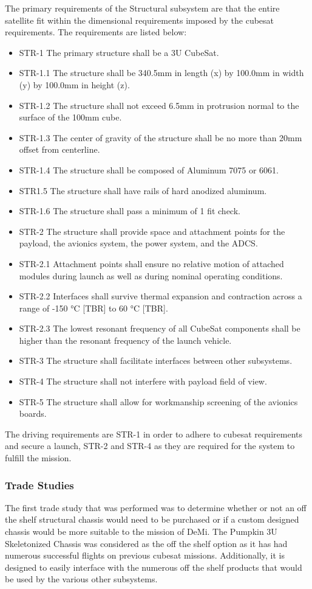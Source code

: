 \documentclass[12pt]{article}
\begin{document}
The primary requirements of the Structural subsystem are that the entire satellite fit within the dimensional requirements imposed by the cubesat requirements. The requirements are listed below:

\begin{itemize}
\item STR-1 The primary structure shall be a 3U CubeSat.
\item STR-1.1 The structure shall be 340.5mm in length (x) by 100.0mm in width (y) by 100.0mm in height (z).
\item STR-1.2 The structure shall not exceed 6.5mm in protrusion normal to the surface of the 100mm cube.             
\item STR-1.3 The center of gravity of the structure shall be no more than 20mm offset from centerline.
\item STR-1.4 The structure shall be composed of Aluminum 7075 or 6061.
\item STR1.5 The structure shall have rails of hard anodized aluminum.
\item STR-1.6 The structure shall pass a minimum of 1 fit check.
\item STR-2 The structure shall provide space and attachment points for the payload, the avionics system, the power system, and the ADCS.
\item STR-2.1 Attachment points shall ensure no relative motion of attached modules during launch as well as during nominal operating conditions.
\item STR-2.2 Interfaces shall survive thermal expansion and contraction across a range of -150 °C [TBR] to 60 °C [TBR].
\item STR-2.3 The lowest resonant frequency of all CubeSat components shall be higher than the resonant frequency of the launch vehicle.
\item STR-3 The structure shall facilitate interfaces between other subsystems.
\item STR-4 The structure shall not interfere with payload field of view.
\item STR-5 The structure shall allow for workmanship screening of the avionics boards.

\end{itemize}

The driving requirements are STR-1 in order to adhere to cubesat requirements and secure a launch, STR-2 and STR-4 as they are required for the system to fulfill the mission.

\subsubsection{Trade Studies}
The first trade study that was performed was to determine whether or not an off the shelf structural chassis would need to be purchased or if a custom designed chassis would be more suitable to the mission of DeMi. The Pumpkin 3U Skeletonized Chassis was considered as the off the shelf option as it has had numerous successful flights on previous cubesat missions. Additionally, it is designed to easily interface with the numerous off the shelf products that would be used by the various other subsystems.
\end{document}
